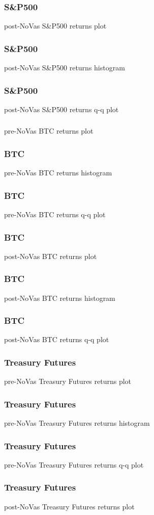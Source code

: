 \documentclass{beamer}
\begin{document}
\begin{frame}
\frametitle{S&P500}
post-NoVas S&P500 returns plot
\end{frame}

\begin{frame}
\frametitle{S&P500}
post-NoVas S&P500 returns histogram
\end{frame}

\begin{frame}
\frametitle{S&P500}
post-NoVas S&P500 returns q-q plot
\end{frame}

\begin{frame}
\frametitle{}
pre-NoVas BTC returns plot
\end{frame}

\begin{frame}
\frametitle{BTC}
pre-NoVas BTC returns histogram
\end{frame}

\begin{frame}
\frametitle{BTC}
pre-NoVas BTC returns q-q plot
\end{frame}

\begin{frame}
\frametitle{BTC}
post-NoVas BTC returns plot
\end{frame}

\begin{frame}
\frametitle{BTC}
post-NoVas BTC returns histogram
\end{frame}

\begin{frame}
\frametitle{BTC}
post-NoVas BTC returns q-q plot
\end{frame}

\begin{frame}
\frametitle{Treasury Futures}
pre-NoVas Treasury Futures returns plot
\end{frame}

\begin{frame}
\frametitle{Treasury Futures}
pre-NoVas Treasury Futures returns histogram
\end{frame}

\begin{frame}
\frametitle{Treasury Futures}
pre-NoVas Treasury Futures returns q-q plot
\end{frame}

\begin{frame}
\frametitle{Treasury Futures}
post-NoVas Treasury Futures returns plot
\end{frame}
\end{document}
